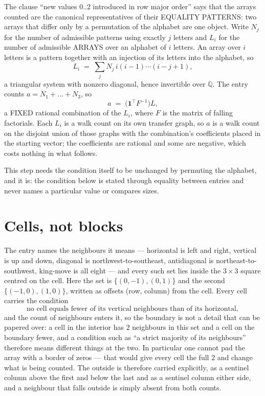 \documentclass[11pt,a4paper]{article}
\theoremstyle{plain}
\theoremstyle{definition}
\begin{document}
The clause ``new values $0..2$ introduced in row major order'' says that the arrays
counted are the canonical representatives of their EQUALITY PATTERNS: two arrays that differ
only by a permutation of the alphabet are one object. Write $N_j$ for the number of admissible
patterns using exactly $j$ letters and $L_i$ for the number of admissible ARRAYS over an
alphabet of $i$ letters. An array over $i$ letters is a pattern together with an injection of
its letters into the alphabet, so
\[
L_i\;=\;\sum_{j}N_j\,i(i-1)\cdots(i-j+1),
\]
a triangular system with nonzero diagonal, hence invertible over $\mathbb{Q}$. The entry
counts $a=N_1+\dots+N_{3}$, so
\[
a\;=\;\bigl(\mathbf{1}^{\!\top}F^{-1}\bigr)L ,
\]
a FIXED rational combination of the $L_i$, where $F$ is the matrix of falling factorials.
Each $L_i$ is a walk count on its own transfer graph, so $a$ is a walk count on the disjoint
union of those graphs with the combination's coefficients placed in the starting vector; the
coefficients are rational and some are negative, which costs nothing in what follows.

This step needs the condition itself to be unchanged by permuting the alphabet, and it is:
the condition below is stated through equality between entries and never names a particular
value or compares sizes.

\section{Cells, not blocks}

The entry names the neighbours it means --- horizontal is left and right, vertical is up and
down, diagonal is northwest-to-southeast, antidiagonal is northeast-to-southwest, king-move is
all eight --- and every such set lies inside the $3\times3$ square centred on the cell. Here
the set is $\{(0,-1), (0,1)\}$ and the second $\{(-1,0), (1,0)\}$, written as offsets (row, column) from the cell. Every cell carries
the condition
\[
\text{no cell equals fewer of its vertical neighbours than of its horizontal},
\]
and the count of neighbours enters it, so the boundary is not a detail that can be papered
over: a cell in the interior has $2$ neighbours in this set and a cell on the boundary
fewer, and a condition such as ``a strict majority of its neighbours'' therefore means
different things at the two. In particular one cannot pad the array with a border of zeros ---
that would give every cell the full $2$ and change what is being counted. The outside is
therefore carried
explicitly, as a sentinel column above the first and below the last and as a sentinel column
either side, and a neighbour that falls outside is simply absent from both counts.
\end{document}
